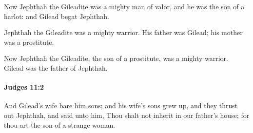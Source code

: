 			\begin{versebox}
					\item[BHS] 
					\item[ASV] Now Jephthah the Gileadite was a mighty man of valor, and he was the son of a harlot: and Gilead begat Jephthah.
					\item[NIV] Jephthah the Gileadite was a mighty warrior. His father was Gilead; his mother was a prostitute.
					\item[NRSV] Now Jephthah the Gileadite, the son of a prostitute, was a mighty warrior. Gilead was the father of Jephthah.
			\end{versebox}

		\paragraph{Judges 11:2} %
			\label{JUDGES-11-2}

			And Gilead’s wife bare him sons; and his wife’s sons grew up, and they thrust out Jephthah, and said unto him, Thou shalt not inherit in our father’s house; for thou art the son of a strange woman.

